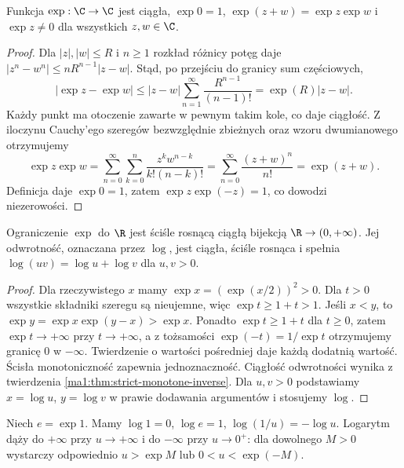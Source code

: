 \begin{twierdzenie}
\label{ma1:thm:exp-addition}
Funkcja $\exp:\C\to\C$ jest ciągła, $\exp 0=1$, $\exp(z+w)=\exp z\exp w$ i $\exp z\ne0$ dla wszystkich $z,w\in\C$.
\end{twierdzenie}
\begin{proof}
Dla $|z|,|w|\le R$ i $n\ge1$ rozkład różnicy potęg daje
$|z^n-w^n|\le nR^{n-1}|z-w|$. Stąd, po przejściu do granicy sum częściowych,
\[
 |\exp z-\exp w|\le |z-w|\sum_{n=1}^\infty\frac{R^{n-1}}{(n-1)!}
 =\exp(R)|z-w|.
\]
Każdy punkt ma otoczenie zawarte w pewnym takim kole, co daje ciągłość. Z iloczynu Cauchy'ego szeregów bezwzględnie zbieżnych oraz wzoru dwumianowego otrzymujemy
\[
 \exp z\exp w=\sum_{n=0}^\infty\sum_{k=0}^n
 \frac{z^kw^{n-k}}{k!(n-k)!}
 =\sum_{n=0}^\infty\frac{(z+w)^n}{n!}=\exp(z+w).
\]
Definicja daje $\exp 0=1$, zatem $\exp z\exp(-z)=1$, co dowodzi niezerowości.
\end{proof}
\begin{twierdzenie}
\label{ma1:thm:real-exp-log}
Ograniczenie $\exp$ do $\R$ jest ściśle rosnącą ciągłą bijekcją $\R\to(0,+\infty)$. Jej odwrotność, oznaczana przez $\log$, jest ciągła, ściśle rosnąca i spełnia
$\log(uv)=\log u+\log v$ dla $u,v>0$.
\end{twierdzenie}
\begin{proof}
Dla rzeczywistego $x$ mamy $\exp x=(\exp(x/2))^2>0$. Dla $t>0$ wszystkie składniki szeregu są nieujemne, więc $\exp t\ge1+t>1$. Jeśli $x<y$, to $\exp y=\exp x\exp(y-x)>\exp x$. Ponadto $\exp t\ge1+t$ dla $t\ge0$, zatem $\exp t\to+\infty$ przy $t\to+\infty$, a z tożsamości $\exp(-t)=1/\exp t$ otrzymujemy granicę $0$ w $-\infty$. Twierdzenie o wartości pośredniej daje każdą dodatnią wartość. Ścisła monotoniczność zapewnia jednoznaczność. Ciągłość odwrotności wynika z twierdzenia \ref{ma1:thm:strict-monotone-inverse}. Dla $u,v>0$ podstawiamy $x=\log u$, $y=\log v$ w prawie dodawania argumentów i stosujemy $\log$.
\end{proof}
Niech $e=\exp 1$. Mamy $\log1=0$, $\log e=1$, $\log(1/u)=-\log u$. Logarytm dąży do $+\infty$ przy $u\to+\infty$ i do $-\infty$ przy $u\to0^+$: dla dowolnego $M>0$ wystarczy odpowiednio $u>\exp M$ lub $0<u<\exp(-M)$.

